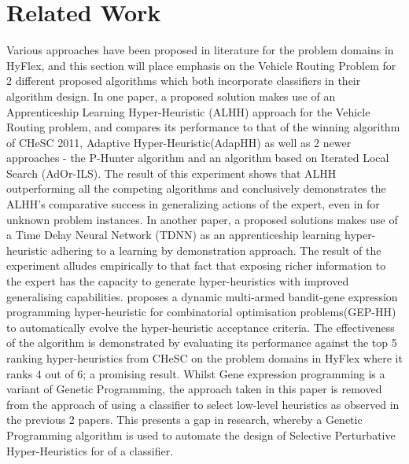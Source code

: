 \documentclass[a4paper,12pt]{article}
\begin{document}
\section{Related Work} 
        \par{
        Various approaches have been proposed in literature for the problem domains in HyFlex, and this section will place emphasis on the Vehicle Routing Problem for 2 different proposed algorithms which both incorporate classifiers in their algorithm design. \newline
        \newline
        In one paper, a proposed solution makes use of an Apprenticeship Learning Hyper-Heuristic (ALHH)\cite{astaozcan} approach for the Vehicle Routing problem, and compares its performance to that of the winning algorithm of CHeSC 2011, Adaptive Hyper-Heuristic(AdapHH) as well as 2 newer approaches - the P-Hunter algorithm \cite{phunter} and an algorithm based on Iterated Local Search (AdOr-ILS)\cite{ILS}. The result of this experiment shows that ALHH outperforming all the competing algorithms and conclusively demonstrates the ALHH's comparative success in generalizing actions of the expert, even in for unknown problem instances.\newline
        \newline
        In another paper, a proposed solutions makes use of a Time Delay Neural Network (TDNN) \cite{tdnn} as an apprenticeship learning hyper-heuristic adhering to a learning by demonstration approach. The result of the experiment alludes empirically to that fact that exposing richer information to the expert has the capacity to generate hyper-heuristics with improved generalising capabilities.\newline
        \newline
        \cite{gehh} proposes a dynamic multi-armed bandit-gene expression programming hyper-heuristic for combinatorial optimisation problems(GEP-HH) to automatically evolve the hyper-heuristic acceptance criteria. The effectiveness of the algorithm is demonstrated by evaluating its performance against the top 5 ranking hyper-heuristics from CHeSC on the problem domains in HyFlex where it ranks 4 out of 6; a promising result.\newline
        \newline
        Whilst Gene expression programming is a variant of Genetic Programming, the approach taken in this paper is removed from the approach of using a classifier to select low-level heuristics as observed in the previous 2 papers. This presents a gap in research, whereby a Genetic Programming algorithm is used to automate the design of Selective Perturbative Hyper-Heuristics for of a classifier.  
        } 
\end{document}
